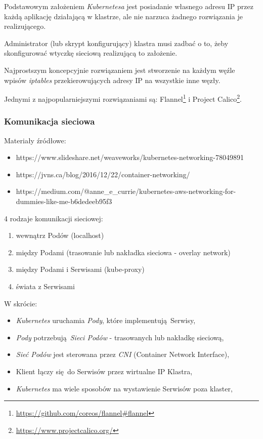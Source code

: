 \documentclass[a4paper,12pt,twoside,openany]{report}
\providecommand{\tightlist}{%
  \setlength{\itemsep}{0pt}\setlength{\parskip}{0pt}}
\DeclareRobustCommand{\href}[2]{#2\footnote{\url{#1}}}
\begin{document}
Podstawowym założeniem \emph{Kubernetesa} jest posiadanie własnego
adresu IP przez każdą aplikację działającą w klastrze, ale nie narzuca
żadnego rozwiązania je realizującego.

Administrator (lub skrypt konfigurujący) klastra musi zadbać o to, żeby
skonfigurować wtyczkę sieciową realizującą to założenie.

Najprostszym koncepcyjnie rozwiązaniem jest stworzenie na każdym węźle
wpisów \emph{iptables} przekierowujących adresy IP na wszystkie inne
węzły.

Jednymi z najpopularniejszymi rozwiązaniami są:
\href{https://github.com/coreos/flannel\#flannel}{Flannel} i
\href{https://www.projectcalico.org/}{Project Calico}.

\hypertarget{komunikacja-sieciowa}{%
\subsubsection{Komunikacja sieciowa}\label{komunikacja-sieciowa}}

Materiały źródłowe:

\begin{itemize}
\tightlist
\item
  https://www.slideshare.net/weaveworks/kubernetes-networking-78049891
\item
  https://jvns.ca/blog/2016/12/22/container-networking/
\item
  https://medium.com/@anne\_e\_currie/kubernetes-aws-networking-for-dummies-like-me-b6dedeeb95f3
\end{itemize}

4 rodzaje komunikacji sieciowej:

\begin{enumerate}
\def\labelenumi{\arabic{enumi}.}
\tightlist
\item
  wewnątrz Podów (localhost)
\item
  między Podami (trasowanie lub nakładka sieciowa - overlay network)
\item
  między Podami i Serwisami (kube-proxy)
\item
  świata z Serwisami
\end{enumerate}

W skrócie:

\begin{itemize}
\tightlist
\item
  \emph{Kubernetes} uruchamia \emph{Pody}, które implementują~Serwisy,
\item
  \emph{Pody} potrzebują~\emph{Sieci Podów} - trasowanych lub nakładkę
  sieciową,
\item
  \emph{Sieć Podów} jest sterowana przez \emph{CNI} (Container Network
  Interface),
\item
  Klient łączy się~do Serwisów przez wirtualne IP Klastra,
\item
  \emph{Kubernetes} ma wiele sposobów na wystawienie Serwisów poza
  klaster,
\end{itemize}
\end{document}
